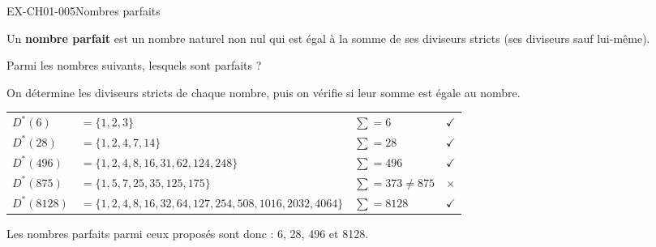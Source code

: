 \documentclass[12pt, a4paper]{article}
\begin{document}
\begin{exercice}{EX-CH01-005}{Nombres parfaits}

\begin{mdframed}[backgroundcolor=vlmgray, innerleftmargin=10pt, innerrightmargin=10pt, innertopmargin=6pt, innerbottommargin=6pt, skipabove=-5pt, skipbelow=5pt]
Un \textbf{nombre parfait} est un nombre naturel non nul qui est égal à la somme de ses diviseurs stricts (ses diviseurs sauf lui-même).
\end{mdframed}


\bigskip
Parmi les nombres suivants, lesquels sont parfaits ?

\bigskip
{}%
{
On détermine les diviseurs stricts de chaque nombre, puis on vérifie si leur somme est égale au nombre.

\vspace{20pt}
\def\arraystretch{1.2}
\begin{tabularx}{\linewidth}{lXlc}
$D^*(6)$    & $= \{1, 2, 3\}$ & $\sum = 6$    & $\checkmark$ \\
$D^*(28)$   & $= \{1, 2, 4, 7, 14\}$                                             & $\sum = 28$  & $\checkmark$ \\
$D^*(496)$  & $= \{1, 2, 4, 8, 16, 31, 62, 124, 248\}$                           & $\sum = 496$  & $\checkmark$ \\
$D^*(875)$  & $= \{1, 5, 7, 25, 35, 125, 175\}$                                  & $\sum = 373 \neq 875$ & $\times$ \\
$D^*(8128)$ & $= \{1, 2, 4, 8, 16, 32, 64, 127, 254, 508, 1016, 2032, 4064\}$   & $\sum = 8128$ & $\checkmark$ \\
\end{tabularx}
\def\arraystretch{1}

\vspace{20pt}
Les nombres parfaits parmi ceux proposés sont donc : 6, 28, 496 et 8128.
}
\end{exercice}
\end{document}
